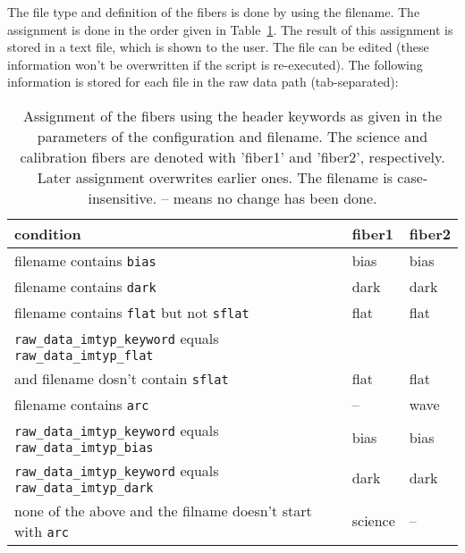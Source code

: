 \documentclass[10pt,a4paper]{article}
\begin{document}
The file type and definition of the fibers is done by using the filename. The assignment is done in the order given in Table~\ref{Tab:fiber_definition}. The result of this assignment is stored in a text file, which is shown to the user. The file can be edited (these information won't be overwritten if the script is re-executed). The following information is stored for each file in the raw data path (tab-separated):
\begin{table}
 \caption{Assignment of the fibers using the header keywords as given in the parameters of the configuration and filename. The science and calibration fibers are denoted with 'fiber1' and 'fiber2', respectively. Later assignment overwrites earlier ones. The filename is case-insensitive. -- means no change has been done.}
 \label{Tab:fiber_definition}
 \begin{tabular}{l l l}
 \small
 condition 															& fiber1 & fiber2 \\
 \hline
 filename contains \verb|bias|										& bias	& bias \\
 filename contains \verb|dark|										& dark	& dark \\
 filename contains \verb|flat| but not \verb|sflat| 				& flat	& flat \\
 \verb|raw_data_imtyp_keyword| equals \verb|raw_data_imtyp_flat| 	&       & \\
 \hspace{1cm} and filename dosn't contain \verb|sflat| 				& flat  & flat \\
 filename contains \verb|arc|						   				& -- 	& wave \\
 \verb|raw_data_imtyp_keyword| equals \verb|raw_data_imtyp_bias| 	& bias	& bias \\
 \verb|raw_data_imtyp_keyword| equals \verb|raw_data_imtyp_dark| 	& dark	& dark \\
 none of the above and the filname doesn't start with \verb|arc|  & science & --   \\
 \end{tabular}
\end{table}
\end{document}
